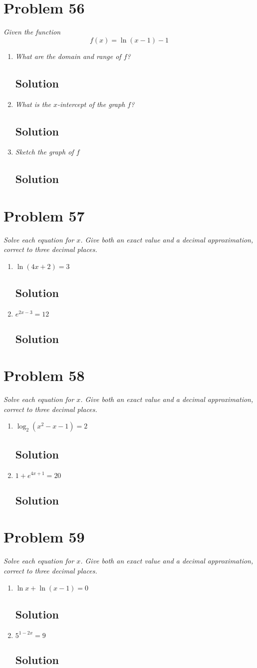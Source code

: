 \documentclass[11pt]{article}
\newcommand{\soln}{\subsection*}
\newcommand{\qn}{\textit}
\begin{document}
\section*{Problem 56}

\qn{Given the function $$f(x)=\ln(x-1)-1$$}
\begin{enumerate}
	\item \qn{What are the domain and range of $f$?}
	\soln{Solution}
	
	\item \qn{What is the $x$-intercept of the graph $f$?}
	\soln{Solution}
	
	\item \qn{Sketch the graph of $f$}
	\soln{Solution}
\end{enumerate}

\section*{Problem 57}

\qn{Solve each equation for $x$. Give both an exact value and a decimal approximation, correct to three decimal places.}
\begin{enumerate}
	\item \qn{$\ln(4x+2)=3$}
	\soln{Solution}
	
	\item \qn{$e^{2x-3}=12$}
	\soln{Solution}
\end{enumerate}

\section*{Problem 58}

\qn{Solve each equation for $x$. Give both an exact value and a decimal approximation, correct to three decimal places.}
\begin{enumerate}
	\item \qn{$\log_2(x^2-x-1)=2$}
	\soln{Solution}
	
	\item \qn{$1+e^{4x+1}=20$}
	\soln{Solution}
\end{enumerate}

\section*{Problem 59}

\qn{Solve each equation for $x$. Give both an exact value and a decimal approximation, correct to three decimal places.}
\begin{enumerate}
	\item \qn{$\ln{x}+\ln(x-1)=0$}
	\soln{Solution}
	
	\item \qn{$5^{1-2x}=9$}
	\soln{Solution}
\end{enumerate}
\end{document}
